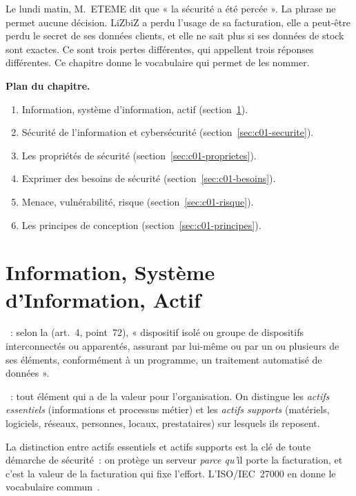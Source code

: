 Le lundi matin, M.~ETEME dit que « la sécurité a été percée ». La phrase
ne permet aucune décision. LiZbiZ a perdu l'usage de sa facturation, elle
a peut-être perdu le secret de ses données clients, et elle ne sait plus si
ses données de stock sont exactes. Ce sont trois pertes différentes, qui
appellent trois réponses différentes. Ce chapitre donne le vocabulaire
qui permet de les nommer.

\medskip
\textbf{Plan du chapitre.}
\begin{enumerate}
    \item Information, système d'information, actif (section~\ref{sec:c01-objets}).
    \item Sécurité de l'information et cybersécurité (section~\ref{sec:c01-securite}).
    \item Les propriétés de sécurité (section~\ref{sec:c01-proprietes}).
    \item Exprimer des besoins de sécurité (section~\ref{sec:c01-besoins}).
    \item Menace, vulnérabilité, risque (section~\ref{sec:c01-risque}).
    \item Les principes de conception (section~\ref{sec:c01-principes}).
\end{enumerate}

\separateur

\section{Information, Système d'Information, Actif}
\label{sec:c01-objets}

\begin{boxdef}
~: selon la 
(art.~4, point~72), « dispositif isolé ou groupe de dispositifs
interconnectés ou apparentés, assurant par lui-même ou par un ou plusieurs
de ses éléments, conformément à un programme, un traitement automatisé de
données ».

\medskip
{}~: tout élément qui a de la valeur pour l'organisation.
On distingue les \emph{actifs essentiels} (informations et processus
métier) et les \emph{actifs supports} (matériels, logiciels, réseaux,
personnes, locaux, prestataires) sur lesquels ils reposent.
\end{boxdef}

La distinction entre actifs essentiels et actifs supports est la clé de
toute démarche de sécurité~: on protège un serveur \emph{parce qu'}il porte
la facturation, et c'est la valeur de la facturation qui fixe l'effort.
L'ISO/IEC~27000 en donne le vocabulaire commun~\cite{iso27000_2018}.

